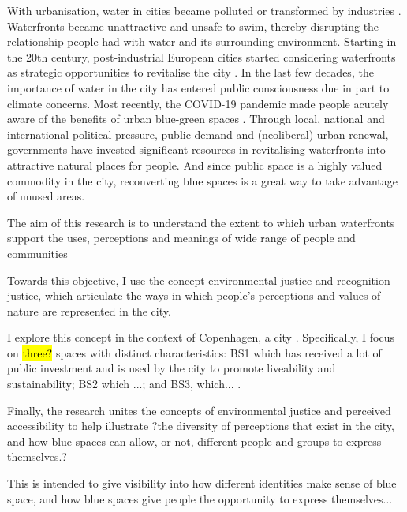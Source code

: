 \documentclass{article}
\begin{document}
With urbanisation, water in cities became polluted or transformed by industries \parencite{kampa_langaas_anzaldua_2016}. 
Waterfronts became unattractive and unsafe to swim, thereby disrupting the relationship people had with water and its surrounding environment.
Starting in the 20th century, post-industrial European cities started considering waterfronts as strategic opportunities to revitalise the city \parencite{del2021dismantling}. In the last few decades, the importance of water in the city has entered public consciousness due in part to climate concerns. Most recently, the COVID-19 pandemic made people acutely aware of the benefits of urban blue-green spaces \parencite{kohsaka2021urban}.
Through local, national and international political pressure, public demand and (neoliberal) urban renewal, governments have invested significant resources in revitalising waterfronts into attractive natural places for people. 
And since public space is a highly valued commodity in the city, reconverting blue spaces is a great way to take advantage of unused areas.


The aim of this research is to understand the extent to which urban waterfronts support the uses, perceptions and meanings of wide range of people and communities

Towards this objective, I use the concept environmental justice and recognition justice, which articulate the ways in which people's perceptions and values of nature are represented in the city.

I explore this concept in the context of Copenhagen, a city . Specifically, I focus on \hl{three?} spaces with distinct characteristics: BS1 which has received a lot of public investment and is used by the city to promote liveability and sustainability; BS2 which ...; and BS3, which... .

Finally, the research unites the concepts of environmental justice and perceived accessibility to help illustrate ?the diversity of perceptions that exist in the city, and how blue spaces can allow, or not, different people and groups to express themselves.?

This is intended to give visibility into how different identities make sense of blue space, and how blue spaces give people the opportunity to express themselves...

\pagebreak
\end{document}
